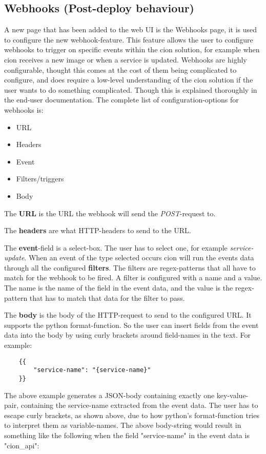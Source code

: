 \subsection{Webhooks (Post-deploy behaviour)}
A new page that has been added to the web UI is the Webhooks page, it is used to configure the new webhook-feature. This feature allows the user to configure webhooks to trigger on specific events within the cion solution, for example when cion receives a new image or when a service is updated. 
Webhooks are highly configurable, thought this comes at the cost of them being complicated to configure, and does require a low-level understanding of the cion solution if the user wants to do something complicated. Though this is explained thoroughly in the end-user documentation. The complete list of configuration-options for webhooks is:

\begin{itemize}
    \item URL
    \item Headers
    \item Event
    \item Filters/triggers
    \item Body
\end{itemize}

The \textbf{URL} is the URL the webhook will send the \textit{POST}-request to.

The \textbf{headers} are what HTTP-headers to send to the URL.

The \textbf{event}-field is a select-box. The user has to select one, for example \textit{service-update}. 
When an event of the type selected occurs cion will run the events data through all the configured \textbf{filters}. The filters are regex-patterns that all have to match for the webhook to be fired. A filter is configured with a name and a value. The name is the name of the field in the event data, and the value is the regex-pattern that has to match that data for the filter to pass.

The \textbf{body} is the body of the HTTP-request to send to the configured URL. It supports the python format-function. So the user can insert fields from the event data into the body by using curly brackets around field-names in the text. For example:

\begin{verbatim}
    {{
        "service-name": "{service-name}"
    }}
\end{verbatim}

The above example generates a JSON-body containing exactly one key-value-pair, containing the service-name extracted from the event data. 
The user has to escape curly brackets, as shown above, due to how python's format-function tries to interpret them as variable-names.
The above body-string would result in something like the following when the field "service-name" in the event data is "cion\_api":

